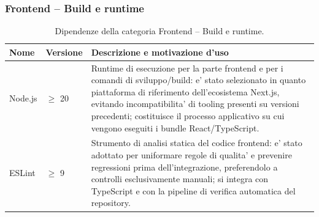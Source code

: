 \documentclass[a4paper, 11pt, oneside]{scrartcl}
\begin{document}
\subsubsection{Frontend -- Build e runtime}
\begin{table}[H]
    \centering
    \renewcommand{\arraystretch}{1.2}
    \begin{tabularx}{\textwidth}{@{}l l X@{}}
        \toprule
        \textbf{Nome} & \textbf{Versione} & \textbf{Descrizione e motivazione d'uso} \\
        \midrule
        Node.js & $\geq$ 20 & Runtime di esecuzione per la parte frontend e per i comandi di sviluppo/build: e' stato selezionato in quanto piattaforma di riferimento dell'ecosistema Next.js, evitando incompatibilita' di tooling presenti su versioni precedenti; costituisce il processo applicativo su cui vengono eseguiti i bundle React/TypeScript. \\
        ESLint & $\geq$ 9 & Strumento di analisi statica del codice frontend: e' stato adottato per uniformare regole di qualita' e prevenire regressioni prima dell'integrazione, preferendolo a controlli esclusivamente manuali; si integra con TypeScript e con la pipeline di verifica automatica del repository. \\
        \bottomrule
    \end{tabularx}
    \caption{Dipendenze della categoria Frontend -- Build e runtime.}
    \label{tab:dip_frontend_build_runtime}
\end{table}
\end{document}
